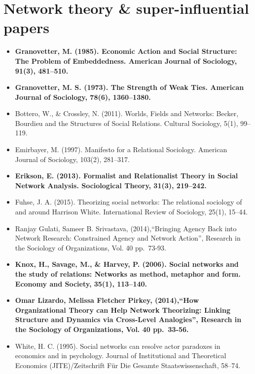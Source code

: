 \documentclass[
]{book}
\begin{document}
\section*{\texorpdfstring{\textbf{Network theory \& super-influential papers}}{Network theory \& super-influential papers}}\label{network-theory-super-influential-papers}

\begin{itemize}
\item
  \textbf{Granovetter, M. (1985). Economic Action and Social Structure: The Problem of Embeddedness. American Journal of Sociology, 91(3), 481--510.}
\item
  \textbf{Granovetter, M. S. (1973). The Strength of Weak Ties. American Journal of Sociology, 78(6), 1360--1380.}
\item
  Bottero, W., \& Crossley, N. (2011). Worlds, Fields and Networks: Becker, Bourdieu and the Structures of Social Relations. Cultural Sociology, 5(1), 99--119.
\item
  Emirbayer, M. (1997). Manifesto for a Relational Sociology. American Journal of Sociology, 103(2), 281--317.
\item
  \textbf{Erikson, E. (2013). Formalist and Relationalist Theory in Social Network Analysis. Sociological Theory, 31(3), 219--242.}
\item
  Fuhse, J. A. (2015). Theorizing social networks: The relational sociology of and around Harrison White. International Review of Sociology, 25(1), 15--44.
\item
  Ranjay Gulati, Sameer B. Srivastava, (2014),``Bringing Agency Back into Network Research: Constrained Agency and Network Action'', Research in the Sociology of Organizations, Vol. 40 pp.~73-93.
\item
  \textbf{Knox, H., Savage, M., \& Harvey, P. (2006). Social networks and the study of relations: Networks as method, metaphor and form. Economy and Society, 35(1), 113--140.}
\item
  \textbf{Omar Lizardo, Melissa Fletcher Pirkey, (2014),``How Organizational Theory can Help Network Theorizing: Linking Structure and Dynamics via Cross-Level Analogies'', Research in the Sociology of Organizations, Vol. 40 pp.~33-56.}
\item
  White, H. C. (1995). Social networks can resolve actor paradoxes in economics and in psychology. Journal of Institutional and Theoretical Economics (JITE)/Zeitschrift Für Die Gesamte Staatswissenschaft, 58--74.

\end{itemize}
\end{document}
